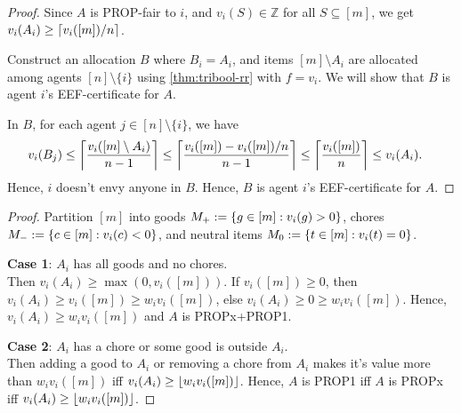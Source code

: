 \begin{proof}
Since $A$ is PROP-fair to $i$, and $v_i(S) \in \mathbb{Z}$ for all $S \subseteq [m]$,
we get $v_i(A_i) \ge \lceil v_i([m])/n \rceil$.

Construct an allocation $B$ where $B_i = A_i$, and items $[m] \setminus A_i$
are allocated among agents $[n] \setminus \{i\}$ using \cref{thm:tribool-rr} with $f = v_i$.
We will show that $B$ is agent $i$'s EEF-certificate for $A$.

In $B$, for each agent $j \in [n] \setminus \{i\}$, we have
\begin{align*}
v_i(B_j) &\le \left\lceil \frac{v_i([m] \setminus A_i)}{n-1} \right\rceil
    \le \left\lceil \frac{v_i([m]) - v_i([m])/n}{n-1} \right\rceil
    \relax\le \left\lceil \frac{v_i([m])}{n} \right\rceil \le v_i(A_i).
\end{align*}
Hence, $i$ doesn't envy anyone in $B$.
Hence, $B$ is agent $i$'s EEF-certificate for $A$.
\end{proof}

\begin{proof}
Partition $[m]$ into
goods $M_+ := \{g \in [m]: v_i(g) > 0\}$,
chores $M_- := \{c \in [m]: v_i(c) < 0\}$,
and neutral items $M_0 := \{t \in [m]: v_i(t) = 0\}$.

\textbf{Case 1}: $A_i$ has all goods and no chores.
\\ Then $v_i(A_i) \ge \max(0, v_i([m]))$.
If $v_i([m]) \ge 0$, then $v_i(A_i) \ge v_i([m]) \ge w_iv_i([m])$,
else $v_i(A_i) \ge 0 \ge w_iv_i([m])$.
Hence, $v_i(A_i) \ge w_iv_i([m])$ and $A$ is PROPx+PROP1.

\textbf{Case 2}: $A_i$ has a chore or some good is outside $A_i$.
\\ Then adding a good to $A_i$ or removing a chore from $A_i$
makes it's value more than $w_iv_i([m])$ iff $v_i(A_i) \ge \lfloor w_iv_i([m]) \rfloor$.
Hence, $A$ is PROP1 iff $A$ is PROPx iff $v_i(A_i) \ge \lfloor w_iv_i([m]) \rfloor$.
\end{proof}

